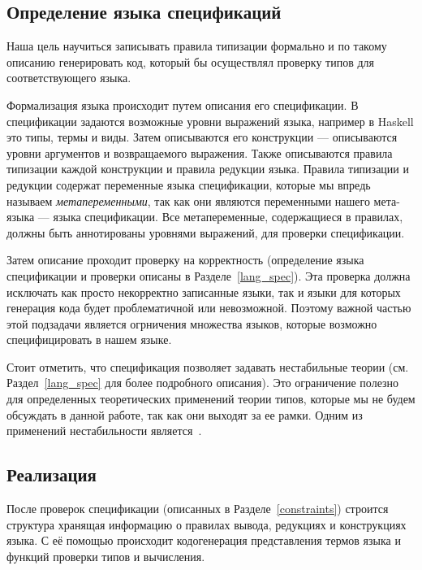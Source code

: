 \subsection*{Определение языка спецификаций}

Наша цель научиться записывать правила типизации формально и по такому описанию генерировать код, который бы осуществлял проверку типов для соответствующего языка.

Формализация языка происходит путем описания его спецификации. В спецификации задаются возможные уровни выражений языка, например в Haskell это типы, термы и виды. Затем описываются его конструкции --- описываются уровни аргументов и возвращаемого выражения. Также описываются правила типизации каждой конструкции и правила редукции языка. Правила типизации и редукции содержат переменные языка спецификации, которые мы впредь называем \textit{метапеременными}, так как они являются переменными нашего мета-языка --- языка спецификации. Все метапеременные, содержащиеся в правилах, должны быть аннотированы уровнями выражений, для проверки спецификации.

Затем описание проходит проверку на корректность (определение языка спецификации и проверки описаны в Разделе~\ref{lang_spec}). Эта проверка должна исключать как просто некорректно записанные языки, так и языки для которых генерация кода будет проблематичной или невозможной. Поэтому важной частью этой подзадачи является огрничения множества языков, которые возможно специфицировать в нашем языке.

Стоит отметить, что спецификация позволяет задавать нестабильные теории (см. Раздел~\ref{lang_spec} для более подробного описания). Это ограничение полезно для определенных теоретических применений теории типов, которые мы не будем обсуждать в данной работе, так как они выходят за ее рамки. Одним из применений нестабильности является~\cite{ncat:inf}.


\subsection*{Реализация}\label{impl_intro}

После проверок спецификации (описанных в Разделе~\ref{constraints}) строится структура хранящая информацию о правилах вывода, редукциях и конструкциях языка. С её помощью происходит кодогенерация представления термов языка и функций проверки типов и вычисления.


